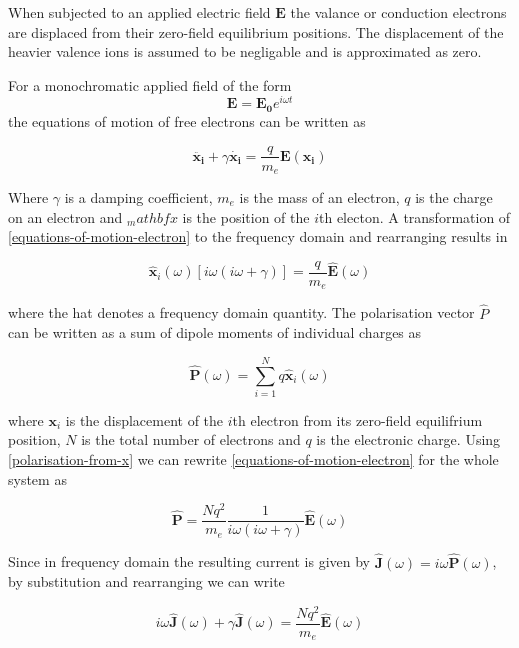 When subjected to an applied electric field $\mathbf{E}$ the valance or conduction electrons are displaced from their zero-field equilibrium positions. The displacement of the heavier valence ions is assumed to be negligable and is approximated as zero.

For a monochromatic applied field of the form
$$
\mathbf{E} = \mathbf{E_0} e^{i \omega t}
$$
the equations of motion of free electrons can be written as

\begin{equation}
\mathbf{\ddot{x_i}} + \gamma \mathbf{\dot{x_i}} = \frac{q}{m_e}\mathbf{E}(\mathbf{x_i})
\label{equations-of-motion-electron}
\end{equation}

Where $\gamma$ is a damping coefficient, $m_e$ is the mass of an electron, $q$ is the charge on an electron and $_mathbf{x}$ is the position of the $i$th electon. A transformation of \eqref{equations-of-motion-electron} to the frequency domain and rearranging results in

\begin{equation}
\hat{\mathbf{x}}_i(\omega) \left[ i \omega ( i \omega + \gamma ) \right] = \frac{q}{m_e}\hat{\mathbf{E}}(\omega)
\end{equation}

where the hat denotes a frequency domain quantity. The polarisation vector $\hat{P}$ can be written as a sum of dipole moments of individual charges as

\begin{equation}
\hat{\mathbf{P}}(\omega) = \sum_{i=1}^N q \hat{\mathbf{x}}_i(\omega)
\label{polarisation-from-x}
\end{equation}

where $\mathbf{x}_i$ is the displacement of the $i$th electron from its zero-field equilifrium position, $N$ is the total number of electrons and $q$ is the electronic charge. Using \eqref{polarisation-from-x} we can rewrite \eqref{equations-of-motion-electron} for the whole system as

\begin{equation}
  \mathbf{\hat{P}} = \frac{N q^2}{m_e} \frac{1}{i \omega ( i \omega + \gamma ) } \mathbf{\hat{E}}(\omega)
\end{equation}

Since in frequency domain the resulting current is given by $\mathbf{\hat{J}}(\omega) = i \omega \mathbf{\hat{P}}(\omega)$, by substitution and rearranging we can write

\begin{equation}
  i \omega \mathbf{\hat{J}}(\omega) + \gamma \mathbf{\hat{J}}(\omega) = \frac{N q^2}{m_e} \mathbf{\hat{E}}(\omega)
\end{equation}

